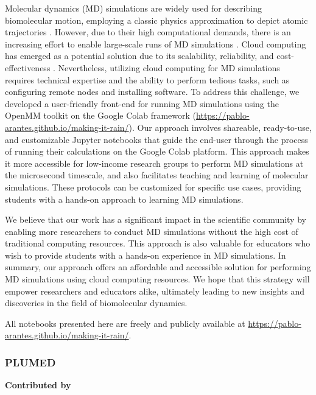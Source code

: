 \documentclass[9pt,review]{livecoms}
\begin{document}
Molecular dynamics (MD) simulations are widely used for describing biomolecular motion, employing a classic physics approximation to depict atomic trajectories \cite{Liu2017,Hollingsworth2018}. However, due to their high computational demands, there is an increasing effort to enable large-scale runs of MD simulations \cite{Hollingsworth2018}. Cloud computing has emerged as a potential solution due to its scalability, reliability, and cost-effectiveness \cite{Ebejer2013}. Nevertheless, utilizing cloud computing for MD simulations requires technical expertise and the ability to perform tedious tasks, such as configuring remote nodes and installing software. To address this challenge, we developed a user-friendly front-end for running MD simulations \cite{Arantes2021} using the OpenMM toolkit \cite{Eastman2017} on the Google Colab framework \cite{colab,Bisong2019} (\url{https://pablo-arantes.github.io/making-it-rain/}). Our approach involves shareable, ready-to-use, and customizable Jupyter notebooks that guide the end-user through the process of running their calculations on the Google Colab platform. This approach makes it more accessible for low-income research groups to perform MD simulations at the microsecond timescale, and also facilitates teaching and learning of molecular simulations. These protocols can be customized for specific use cases, providing students with a hands-on approach to learning MD simulations.

We believe that our work has a significant impact in the scientific community by enabling more researchers to conduct MD simulations without the high cost of traditional computing resources. This approach is also valuable for educators who wish to provide students with a hands-on experience in MD simulations. In summary, our approach offers an affordable and accessible solution for performing MD simulations using cloud computing resources. We hope that this strategy will empower researchers and educators alike, ultimately leading to new insights and discoveries in the field of biomolecular dynamics.

All notebooks presented here are freely and publicly available at  \url{https://pablo-arantes.github.io/making-it-rain/}.

\subsubsection{PLUMED}

\textbf{Contributed by }
\end{document}

